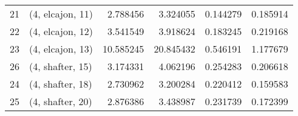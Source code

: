 \begin{tabular}{llrrrr}
21 &  (4, elcajon, 11) &   2.788456 &   3.324055 &   0.144279 &  0.185914 \\
22 &  (4, elcajon, 12) &   3.541549 &   3.918624 &   0.183245 &  0.219168 \\
23 &  (4, elcajon, 13) &  10.585245 &  20.845432 &   0.546191 &  1.177679 \\
26 &  (4, shafter, 15) &   3.174331 &   4.062196 &   0.254283 &  0.206618 \\
24 &  (4, shafter, 18) &   2.730962 &   3.200284 &   0.220412 &  0.159583 \\
25 &  (4, shafter, 20) &   2.876386 &   3.438987 &   0.231739 &  0.172399 \\
\bottomrule
\end{tabular}
